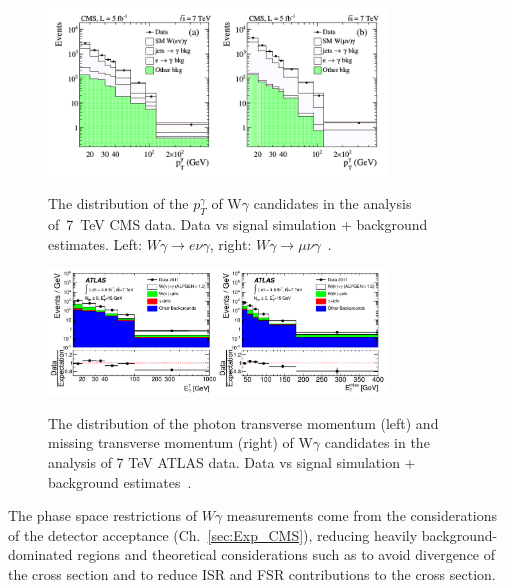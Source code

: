 \begin{figure}[htb]
  \begin{center}
    {\includegraphics[width=0.80\textwidth]{../figs/WgAbout/Wg7TeV_CMS_ptGamma.png}}
    \caption{The distribution of the $p_T^\gamma$ of W$\gamma$ candidates in the analysis of~7~TeV CMS data. Data vs signal simulation + background estimates. Left: $W\gamma\rightarrow e\nu\gamma$, right: $W\gamma\rightarrow \mu\nu\gamma$~\cite{ref_7TeV_CMS}.}
    \label{fig:Wg7TeV_CMS_ptGamma}
  \end{center}
\end{figure}

\begin{figure}[htb]
  \begin{center}
    {\includegraphics[width=0.80\textwidth]{../figs/WgAbout/Wg7TeV_ATLAS_ptGamma.png}}
    \caption{The distribution of the photon transverse momentum (left) and missing transverse momentum (right) of W$\gamma$ candidates in the analysis of 7 TeV ATLAS data. Data vs signal simulation + background estimates~\cite{ref_7TeV_ATLAS}. }
    \label{fig:Wg7TeV_ATLAS_ptGamma}
  \end{center}
\end{figure}

The phase space restrictions of $W\gamma$ measurements come from the considerations of the detector acceptance (Ch.~\ref{sec:Exp_CMS}), reducing heavily background-dominated regions and theoretical considerations such as to avoid divergence of the cross section and to reduce ISR and FSR contributions to the cross section.

